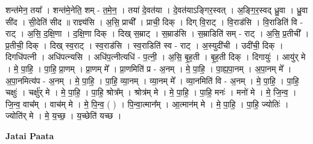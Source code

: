 \documentclass[17pt]{extarticle}
\begin{document}
शन्त॑मेन॒ तया᳚ । शन्त॑मे॒नेति॒ शम् - त॒मे॒न॒ । तया॑ दे॒वत॑या । दे॒वत॑याऽङ्गिर॒स्वत् । अ॒ङ्गि॒र॒स्वद् ध्रु॒वा । ध्रु॒वा सी॑द । सी॒देति॑ सीद ॥ राज्ञ्य॑सि । अ॒सि॒ प्राची᳚ । प्राची॒ दिक् । दिग् वि॒राट् । वि॒राड॑सि । वि॒राडिति॑ वि - राट् । अ॒सि॒ द॒क्षि॒णा । द॒क्षि॒णा दिक् । दिख् स॒म्राट् । स॒म्राड॑सि । स॒म्राडिति॑ सम् - राट् । अ॒सि॒ प्र॒तीची᳚ । प्र॒तीची॒ दिक् । दिख् स्व॒राट् । स्व॒राड॑सि । स्व॒राडिति॑ स्व - राट् । अ॒स्युदी॑ची । उदी॑ची॒ दिक् । दिगधि॑पत्नी । अधि॑पत्न्यसि । अधि॑प॒त्नीत्यधि॑ - प॒त्नी॒ । अ॒सि॒ बृ॒ह॒ती । बृ॒ह॒ती दिक् । दिगायुः॑ । आयु॑र् मे । मे॒ पा॒हि॒ । पा॒हि॒ प्रा॒णम् । प्रा॒णम् मे᳚ । प्रा॒णमिति॑ प्र - अ॒नम् । मे॒ पा॒हि॒ । पा॒ह्य॒पा॒नम् । अ॒पा॒नम् मे᳚ । अ॒पा॒नमित्य॑प - अ॒नम् । मे॒ पा॒हि॒ । पा॒हि॒ व्या॒नम् । व्या॒नम् मे᳚ । व्या॒नमिति॑ वि - अ॒नम् । मे॒ पा॒हि॒ । पा॒हि॒ चक्षुः॑ । चर्क्षु॑र् मे । मे॒ पा॒हि॒ । पा॒हि॒ श्रोत्र᳚म् । श्रोत्र॑म् मे । मे॒ पा॒हि॒ । पा॒हि॒ मनः॑ । मनो॑ मे । मे॒ जि॒न्व॒ । जि॒न्व॒ वाच᳚म् । वाच॑म् मे । मे॒ पि॒न्व॒ ( ) । पि॒न्वा॒त्मान᳚म् । आ॒त्मान॑म् मे । मे॒ पा॒हि॒ । पा॒हि॒ ज्योतिः॑ । ज्योति॑र् मे । मे॒ य॒च्छ॒ । य॒च्छेति॑ यच्छ । \newline

\textbf{Jatai Paata} \newline
\end{document}
